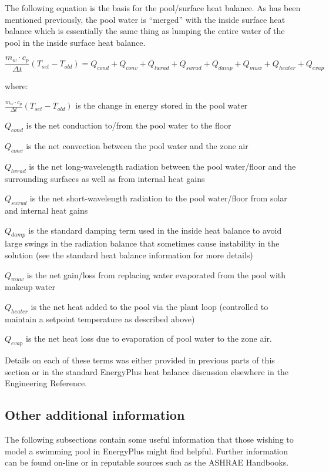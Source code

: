 The following equation is the basis for the pool/surface heat balance. As has been mentioned previously, the pool water is ``merged'' with the inside surface heat balance which is essentially the same thing as lumping the entire water of the pool in the inside surface heat balance.

\begin{equation}
\frac{m_w \cdot c_p}{\Delta t} (T_{set} - T_{old}) = Q_{cond} + Q_{conv} + Q_{lwrad} + Q_{swrad} + Q_{damp} + Q_{muw} + Q_{heater} + Q_{evap}
\end{equation}

where:

\(\frac{m_w \cdot c_p}{\Delta t} (T_{set} - T_{old} )\) is the change in energy stored in the pool water

\(Q_{cond}\) is the net conduction to/from the pool water to the floor

\(Q_{conv}\) is the net convection between the pool water and the zone air

\(Q_{lwrad}\) is the net long-wavelength radiation between the pool water/floor and the surrounding surfaces as well as from internal heat gains

\(Q_{swrad}\) is the net short-wavelength radiation to the pool water/floor from solar and internal heat gains

\(Q_{damp}\) is the standard damping term used in the inside heat balance to avoid large swings in the radiation balance that sometimes cause instability in the solution (see the standard heat balance information for more details)

\(Q_{muw}\) is the net gain/loss from replacing water evaporated from the pool with makeup water

\(Q_{heater}\) is the net heat added to the pool via the plant loop (controlled to maintain a setpoint temperature as described above)

\(Q_{evap}\) is the net heat loss due to evaporation of pool water to the zone air.


Details on each of these terms was either provided in previous parts of this section or in the standard EnergyPlus heat balance discussion elsewhere in the Engineering Reference.

\subsection{Other additional information}\label{other-additional-information}

The following subsections contain some useful information that those wishing to model a swimming pool in EnergyPlus might find helpful. Further information can be found on-line or in reputable sources such as the ASHRAE Handbooks.


